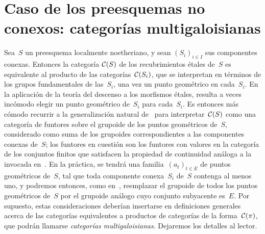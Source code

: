 \section{Caso de los preesquemas no conexos: categorías multigaloisianas}
\label{V.9}

Sea~$S$ un preesquema localmente noetheriano, y sean
$(S_i)_{i\in I}$ sus componentes conexas. Entonces la categoría
$\cal{C}(S)$ de los recubrimientos étales de~$S$ es equivalente
al producto de las categorías~$\cal{C}(S_i)$, que se interpretan
en términos de los grupos fundamentales de las~$S_i$, una vez
 un punto geométrico en
cada~$S_i$. En la aplicación de la teoría del descenso a los morfismos
étales, resulta a veces incómodo elegir un punto geométrico de~$S_i$
para cada~$S_i$. Es entonces más cómodo recurrir a la generalización
natural de~ para interpretar~$\cal{C}(S)$ como una categoría
de funtores sobre el grupoide de los puntos geométricos de~$S$,
considerado como suma de los grupoides correspondientes a las componentes
conexas de~$S$; los funtores en cuestión son los funtores con valores en
la categoría de los conjuntos finitos que satisfacen la propiedad de
continuidad análoga a la invocada en~. En la práctica, se tendrá
una familia~$(a_t)_{t\in E}$ de puntos geométricos de~$S$, tal que toda
componente conexa~$S_i$ de~$S$ contenga al menos uno, y podremos entonces,
como en~, reemplazar el grupoide de todos los puntos geométricos
de~$S$ por el grupoide análogo cuyo conjunto subyacente es~$E$. Por supuesto,
estas consideraciones deberían insertarse en definiciones generales acerca
de las categorías equivalentes a productos de categorías de la
forma~$\cal{C}(\pi)$, que podrán llamarse
\emph{categorías multigaloisianas}.
%
Dejaremos los detalles al lector.
